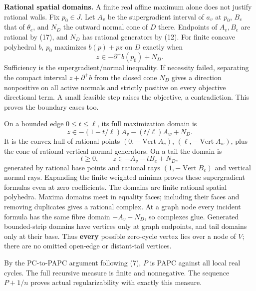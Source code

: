 \documentclass[
  11pt,
]{article}
\begin{document}
\textbf{Rational spatial domains.} A finite real affine maximum alone
does not justify rational walls. Fix \(p_0\in J\). Let \(A_v\) be the
supergradient interval of \(a_v\) at \(p_0\), \(B_e\) that of
\(\theta_e\), and \(N_D\) the outward normal cone of \(D\) there.
Endpoints of \(A_v,B_e\) are rational by (17), and \(N_D\) has rational
generators by (12). For finite concave polyhedral \(b\), \(p_0\)
maximizes \(b(p)+pz\) on \(D\) exactly when \[
                                z\in-\partial^+b(p_0)+N_D.             \tag{20}
\] Sufficiency is the supergradient/normal inequality. If necessity
failed, separating the compact interval \(z+\partial^+b\) from the
closed cone \(N_D\) gives a direction nonpositive on all active normals
and strictly positive on every objective directional term. A small
feasible step raises the objective, a contradiction. This proves the
boundary cases too.

On a bounded edge \(0\leq t\leq\ell\), its full maximization domain is
\[
 z\in-(1-t/\ell)A_v-(t/\ell)A_w+N_D.                       \tag{21}
\] It is the convex hull of rational points
\((0,-\operatorname{Vert}A_v)\), \((\ell,-\operatorname{Vert}A_w)\),
plus the cone of rational vertical normal generators. On a tail the
domain is \[
 t\geq0,\qquad z\in-A_v-tB_e+N_D,                         \tag{22}
\] generated by rational base points and rational rays
\((1,-\operatorname{Vert}B_e)\) and vertical normal rays. Expanding the
finite weighted minima proves these supergradient formulas even at zero
coefficients. The domains are finite rational spatial polyhedra. Maxima
domains meet in equality faces; including their faces and removing
duplicates gives a rational complex. At a graph node every incident
formula has the same fibre domain \(-A_v+N_D\), so complexes glue.
Generated bounded-strip domains have vertices only at graph endpoints,
and tail domains only at their base. Thus \textbf{every} possible
zero-cycle vertex lies over a node of \(V\); there are no omitted
open-edge or distant-tail vertices.

By the PC-to-PAPC argument following (7), \(P\) is PAPC against all
local real cycles. The full recursive measure is finite and nonnegative.
The sequence \(P+1/n\) proves actual regularizability with exactly this
measure.
\end{document}
